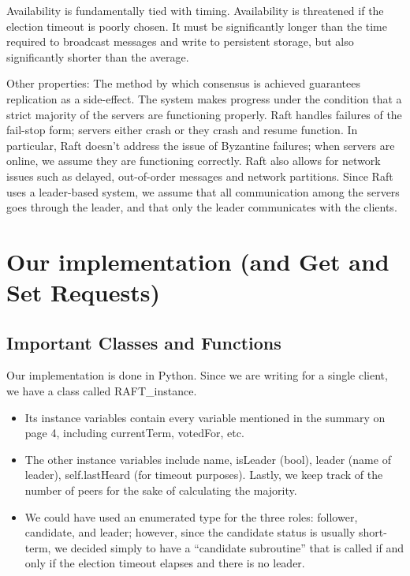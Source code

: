 \documentclass{article}
\begin{document}
Availability is fundamentally tied with timing. Availability is threatened if the election timeout is poorly chosen. It must be significantly longer than the time required to broadcast messages and write to persistent storage, but also significantly shorter than the average.

Other properties: The method by which consensus is achieved guarantees replication as a side-effect. The system makes progress under the condition that a strict majority of the servers are functioning properly. Raft handles failures of the fail-stop form; servers either crash or they crash and resume function. In particular, Raft doesn’t address the issue of Byzantine failures; when servers are online, we assume they are functioning correctly. Raft also allows for network issues such as delayed, out-of-order messages and network partitions. Since Raft uses a leader-based system, we assume that all communication among the servers goes through the leader, and that only the leader communicates with the clients.

\newpage

\section{Our implementation (and Get and Set Requests)}

\subsection{Important Classes and Functions}

Our implementation is done in Python. Since we are writing for a single client, we have a class called RAFT\_instance. 
\begin{itemize}
\item Its instance variables contain every variable mentioned in the summary on page 4, including currentTerm, votedFor, etc.
\item The other instance variables include name, isLeader (bool), leader (name of leader), self.lastHeard (for timeout purposes). Lastly, we keep track of the number of peers for the sake of calculating the majority.
\item We could have used an enumerated type for the three roles: follower, candidate, and leader; however, since the candidate status is usually short-term, we decided simply to have a “candidate subroutine” that is called if and only if the election timeout elapses and there is no leader.
\end{itemize}
\end{document}

